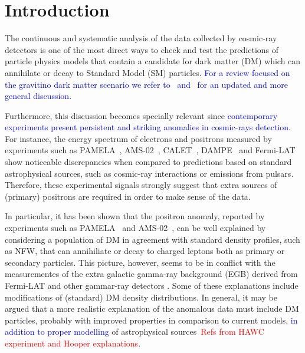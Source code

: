 \documentclass[a4paper,11pt]{article}
\newcommand*{\blue}{\textcolor{blue}}
\newcommand*{\red}{\textcolor{red}}
\begin{document}
\maketitle


\newpage
\section{Introduction}

The continuous and systematic analysis of the data collected by cosmic-ray detectors is one of the most direct ways to check and test the predictions of particle physics models that contain a candidate for dark matter (DM) which can annihilate or decay to Standard Model (SM) particles. \blue{For a review focused on the gravitino dark matter scenario we refer to~\cite{Grefe:2011dp} and~\cite{Hooper:2018kfv} for an updated and more general discussion.} 

Furthermore, this discussion becomes specially relevant since \blue{contemporary experiments present persistent and striking anomalies in cosmic-rays detection}. For instance, the energy spectrum of electrons and positrons measured by experiments such as PAMELA~\cite{Adriani:2008zr}, AMS-02~\cite{Accardo:2014lma,Aguilar:2014mma,Aguilar:2014fea}, CALET~\cite{Adriani:2018ktz}, DAMPE~\cite{Ambrosi:2017wek} and Fermi-LAT~\cite{Ackermann:2014usa} show noticeable discrepancies when compared to predictions based on standard astrophysical sources, such as cosmic-ray interactions or emissions from pulsars. Therefore, these experimental signals strongly suggest that extra sources of (primary) positrons are required in order to make sense of the data. 

In particular, it has been shown that the positron anomaly, reported by experiments such as PAMELA~\cite{Adriani:2008zr} and AMS-02~\cite{Accardo:2014lma}, can be well explained by considering a population of DM in agreement with standard density profiles, such as NFW, that can annihiliate or decay to charged leptons both as primary or secondary particles. This picture, however, seems to be in conflict with the measurementes of the extra galactic gamma-ray background (EGB) derived from Fermi-LAT and other gammar-ray detectors \cite{Grefe:2008zz,2012PhRvD..86h3506C,Ando:2015qda,Laletin:2016egv,Liu:2016ngs,Belotsky:2016tja}. Some of these explanations include modifications of (standard) DM density distributions. In general, it may be argued that a more realistic explanation of the anomalous data must include DM particles, probably with improved properties in comparison to current models, \blue{in addition to proper modelling} of astrophysical sources~\red{Refs from HAWC experiment and Hooper explanations}.
\end{document}
